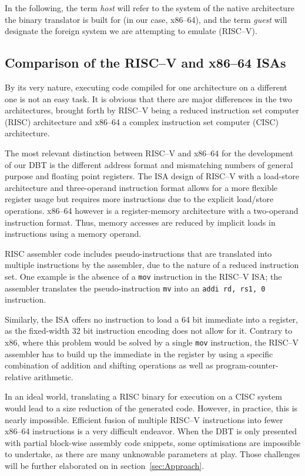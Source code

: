 In the following, the term \textit{host} will refer to the system of the native architecture the binary translator is built for (in our case, x86--64), and the term \textit{guest} will designate the foreign system we are attempting to emulate (RISC--V).

\subsection{Comparison of the RISC--V and x86--64 ISAs}
\label{sec:isa-cmp}
By its very nature, executing code compiled for one architecture on a different one is not an easy task.
It is obvious that there are major differences in the two architectures, brought forth by RISC--V being a reduced instruction set computer (RISC) architecture and x86--64 a complex instruction set computer (CISC) architecture.

The most relevant distinction between RISC--V and x86--64 for the development of our DBT is the different address format and mismatching numbers of general purpose and floating point registers.
The ISA design of RISC--V with a load-store architecture and three-operand instruction format allows for a more flexible register usage but requires more instructions due to the explicit load/store operations.
x86--64 however is a register-memory architecture with a two-operand instruction format.
Thus, memory accesses are reduced by implicit loads in instructions using a memory operand.

RISC assembler code includes pseudo-instructions that are translated into multiple instructions by the assembler, due to the nature of a reduced instruction set.
One example is the absence of a \texttt{mov} instruction in the RISC--V ISA\@; the assembler translates the pseudo-instruction \texttt{mv} into an \texttt{addi rd, rs1, 0} instruction.

Similarly, the ISA offers no instruction to load a 64 bit immediate into a register, as the fixed-width 32 bit instruction encoding does not allow for it.
Contrary to x86, where this problem would be solved by a single \texttt{mov} instruction, the RISC--V assembler has to build up the immediate in the register by using a specific combination of addition and shifting operations as well as program-counter-relative arithmetic.

In an ideal world, translating a RISC binary for execution on a CISC system would lead to a size reduction of the generated code.
However, in practice, this is nearly impossible.
Efficient fusion of multiple RISC--V instructions into fewer x86--64 instructions is a very difficult endeavor.
When the DBT is only presented with partial block-wise assembly code snippets, some optimisations are impossible to undertake, as there are many unknowable parameters at play.
Those challenges will be further elaborated on in section~\ref{sec:Approach}.


